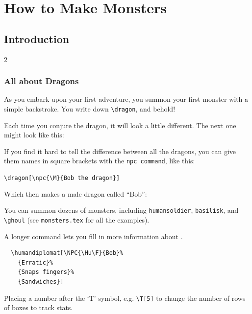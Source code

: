 \documentclass[a4paper,openany]{book}
\date{\today}
\begin{document}
\chapter{How to Make Monsters}

\section{Introduction}

\begin{multicols}{2}

\subsection{All about Dragons}

\begin{boxtext}
  As you embark upon your first adventure, you summon your first monster with a simple backstroke.
  You write down \verb"\dragon", and behold!
\end{boxtext}


Each time you conjure the dragon, it will look a little different.
The next one might look like this:

\dragon

If you find it hard to tell the difference between all the dragons, you can give them names in square brackets with the \verb"npc command", like this:

\verb"\dragon[\npc{\M}{Bob the dragon}]"

Which then makes a male dragon called ``Bob'':


You can summon dozens of monsters, including \verb"humansoldier", \verb"basilisk", and \verb"\ghoul"
(see \verb"monsters.tex" for all the examples).

A longer command lets you fill in more information about .

\begin{verbatim}
  \humandiplomat[\NPC{\Hu\F}{Bob}%
    {Erratic}%
    {Snaps fingers}%
    {Sandwiches}]
\end{verbatim}


Placing a number after the `T' symbol, e.g. \verb"\T[5]" to change the number of rows of boxes to track stats.


\end{multicols}
\end{document}
